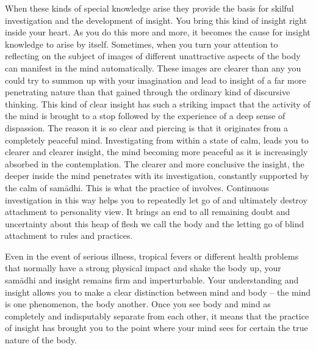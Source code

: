 When these kinds of special knowledge arise they provide the basis for skilful investigation and the development of insight. You bring this kind of insight right inside your heart. As you do this more and more, it becomes the cause for insight knowledge to arise by itself. Sometimes, when you turn your attention to reflecting on the subject of  images of different unattractive aspects of the body can manifest in the mind automatically. These images are clearer than any you could try to summon up with your imagination and lead to insight of a far more penetrating nature than that gained through the ordinary kind of discursive thinking. This kind of clear insight has such a striking impact that the activity of the mind is brought to a stop followed by the experience of a deep sense of dispassion. The reason it is so clear and piercing is that it originates from a completely peaceful mind. Investigating from within a state of calm, leads you to clearer and clearer insight, the mind becoming more peaceful as it is increasingly absorbed in the contemplation. The clearer and more conclusive the insight, the deeper inside the mind penetrates with its investigation, constantly supported by the calm of sam\=adhi. This is what the practice of  involves. Continuous investigation in this way helps you to repeatedly let go of and ultimately destroy attachment to personality view. It brings an end to all remaining doubt and uncertainty about this heap of flesh we call the body and the letting go of blind attachment to rules and practices.

Even in the event of serious illness, tropical fevers or different health problems that normally have a strong physical impact and shake the body up, your sam\=adhi and insight remains firm and imperturbable. Your understanding and insight allows you to make a clear distinction between mind and body -- the mind is one phenomenon, the body another. Once you see body and mind as completely and indisputably separate from each other, it means that the practice of insight has brought you to the point where your mind sees for certain the true nature of the body.

